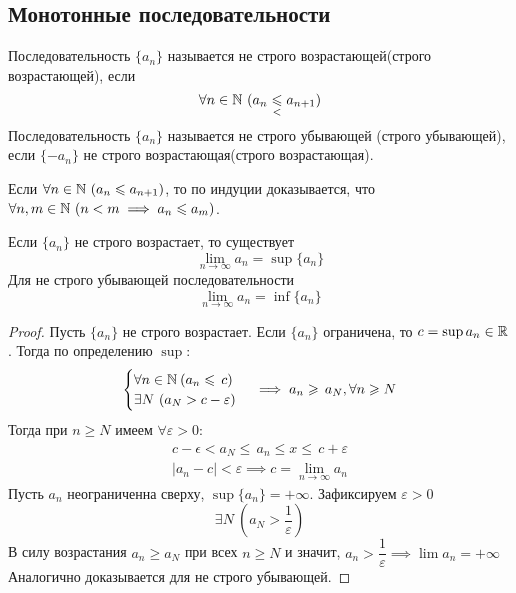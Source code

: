 \subsection{Монотонные последовательности}
\begin{definition}
    Последовательность $ \{a_n\} $ называется не строго возрастающей(строго возрастающей), если \begin{equation}
        \forall n \in \mathbb{N} \ (a_n \underset{ <}{ \leqslant} a_{n + 1})
    \end{equation}
    Последовательность $ \{a_n\} $ называется не строго убывающей (строго убывающей), если $ \{- a_n\} $ не строго возрастающая(строго возрастающая).
\end{definition}
\begin{note}
    Если $ \forall  n \in \mathbb{N}\ (a_n \leqslant  a_{n + 1}) $, то по индуции доказывается, что $ \forall  n, m \in \mathbb{N}\ (n < m \implies  a_n \leqslant  a_m) $.
\end{note}
\begin{theorem} \label{Weierstrass_theorem}
    Если $ \{a_n\} $ не строго возрастает, то существует \[ \lim_{n \to \infty}a_n = \sup\{a_n\} \]
    Для не строго убывающей последовательности \[ \lim_{n \to \infty}a_n = \inf\{a_n\} \]
\end{theorem}
\begin{proof}
    Пусть $ \{a_n\} $ не строго возрастает. Если $ \{a_n\} $ ограничена, то $ c = \sup{a_n} \in  \mathbb{R} $. Тогда по определению $ \sup $: \begin{gather} \begin{cases}
        \forall n \in \mathbb{N}\:  (a_n \leqslant\, c) \\
        \exists N \ (a_N > c - \varepsilon)
    \end{cases} \implies a_n \geqslant\, a_N, \forall n \geqslant N
    \end{gather}
    Тогда при $ n \geq  N $ имеем $ \forall \varepsilon > 0 $: \begin{gather}
        c - \epsilon < a_N \leq\, a_n \leq x \leq\, c + \varepsilon \\
        |a_n - c | < \varepsilon \implies c = \lim_{n \to \infty} a_n
    \end{gather}
    Пусть $ a_n $ неограниченна сверху, $ \sup\{a_n\} = + \infty $. Зафиксируем $ \varepsilon > 0 $ \begin{equation}
        \exists N \ \left(a_N > \frac{1}{\varepsilon}\right)
    \end{equation} В силу возрастания $ a_n \geq a_N $ при всех $ n \geq  N $ и значит, $ a_n > \dfrac{1}{\varepsilon}  \implies  \lim a_n = + \infty$
    Аналогично доказывается для не строго убывающей.
\end{proof}
